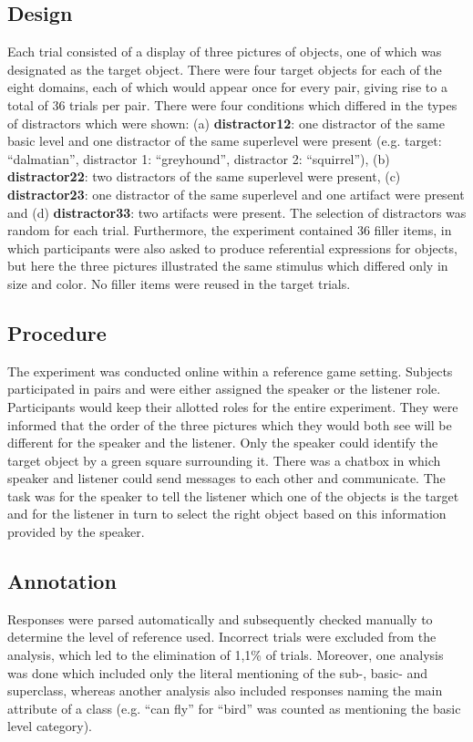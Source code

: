 \documentclass[10pt,letterpaper]{article}
\begin{document}
\subsection{\bf Design}
Each trial consisted of a display of three pictures of objects, one of which was designated as the target object. There were four target objects for each of the eight domains, each of which would appear once for every pair, giving rise to a total of 36 trials per pair. There were four conditions which differed in the types of distractors which were shown: (a) {\bf distractor12}: one distractor of the same basic level and one distractor of the same superlevel were present (e.g. target: ``dalmatian'', distractor 1: ``greyhound'', distractor 2: ``squirrel''), (b) {\bf distractor22}: two distractors of the same superlevel were present, (c) {\bf distractor23}: one distractor of the same superlevel and one artifact were present and (d) {\bf distractor33}: two artifacts were present. The selection of distractors was random for each trial. Furthermore, the experiment contained 36 filler items, in which participants were also asked to produce referential expressions for objects, but here the three pictures illustrated the same stimulus which differed only in size and color. No filler items were reused in the target trials.

\subsection{\bf Procedure}
The experiment was conducted online within a reference game setting. Subjects participated in pairs and were either assigned the speaker or the listener role. Participants would keep their allotted roles for the entire experiment. They were informed that the order of the three pictures which they would both see will be different for the speaker and the listener. Only the speaker could identify the target object by a green square surrounding it. There was a chatbox in which speaker and listener could send messages to each other and communicate. The task was for the speaker to tell the listener which one of the objects is the target and for the listener in turn to select the right object based on this information provided by the speaker. 

\subsection{\bf Annotation}
Responses were parsed automatically and subsequently checked manually to determine the level of reference used. Incorrect trials were excluded from the analysis, which led to the elimination of 1,1\% of trials. Moreover, one analysis was done which included only the literal mentioning of the sub-, basic- and superclass, whereas another analysis also included responses naming the main attribute of a class (e.g. ``can fly'' for ``bird'' was counted as mentioning the basic level category). 
\end{document}
